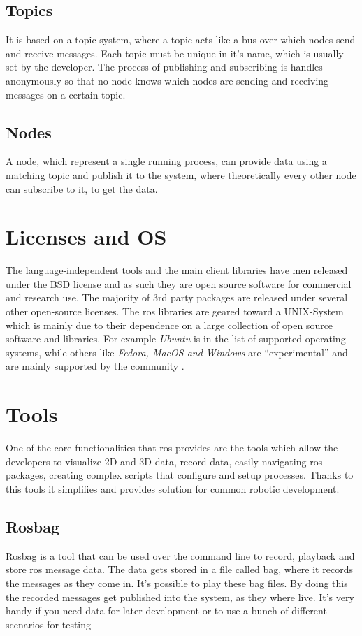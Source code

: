 \subsection{Topics}
It is based on a topic system, where a topic acts like a bus over which nodes send and receive messages. Each topic must be unique in it's name, which is usually set by the developer. The process of publishing and subscribing is handles anonymously so that no node knows which nodes are sending and receiving messages on a certain topic.

\subsection{Nodes}
A node, which represent a single running process, can provide data using a matching topic and publish it to the system, where theoretically every other node can subscribe to it, to get the data. 

\section{Licenses and OS}
The language-independent tools and the main client libraries have men released under the BSD license and as such they are open source software for commercial and research use. The majority of 3rd party packages are released under several other open-source licenses.\newline
The \gls{ros} libraries are geared toward a UNIX-System which is mainly due to their dependence on a large collection of open source software and libraries.
For example \textit{Ubuntu} is in the list of supported operating systems, while others like \textit{Fedora, MacOS and Windows} are \enquote{experimental} and are mainly supported by the community \cite{isrosforme}.

\section{Tools}
One of the core functionalities that \gls{ros} provides are the tools which allow the developers to visualize 2D and 3D data, record data, easily navigating \gls{ros} packages, creating complex scripts that configure and setup processes. Thanks to this tools it simplifies and provides solution for common robotic development.

\subsection{Rosbag}
Rosbag is a tool that can be used over the command line to record, playback and store \gls{ros} message data. The data gets stored in a file called bag, where it records the messages as they come in. It's possible to play these bag files. By doing this the recorded messages get published into the system, as they where live. It's very handy if you need data for later development or to use a bunch of different scenarios for testing

